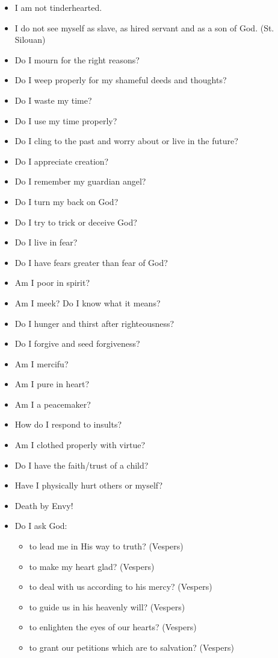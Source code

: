 \begin{itemize}
\item I am not tinderhearted.
\item I do not see myself as slave, as hired servant and as a son of God. (St. Silouan)
\item Do I mourn for the right reasons?
\item Do I weep properly for my shameful deeds and thoughts?
\item Do I waste my time?
\item Do I use my time properly?
\item Do I cling to the past and worry about or live in the future?
\item Do I appreciate creation?
\item Do I remember my guardian angel?
\item Do I turn my back on God?
\item Do I try to trick or deceive God?
\item Do I live in fear?
\item Do I have fears greater than fear of God?
\item Am I poor in spirit?
\item Am I meek? Do I know what it means?
\item Do I hunger and thirst after righteousness?
\item Do I forgive and seed forgiveness?
\item Am I mercifu?
\item Am I pure in heart?
\item Am I a peacemaker?
\item How do I respond to insults?
\item Am I clothed properly with virtue?
\item Do I have the faith/trust of a child?
\item Have I physically hurt others or myself?
\item Death by Envy!
\item Do I ask God:
  \begin{itemize}
  \item to lead me in His way to truth? (Vespers)
  \item to make my heart glad? (Vespers)
  \item to deal with us according to his mercy? (Vespers)
  \item to guide us in his heavenly will? (Vespers)
  \item to enlighten the eyes of our hearts? (Vespers)
  \item to grant our petitions which are to salvation? (Vespers)

\end{itemize}
\end{itemize}
